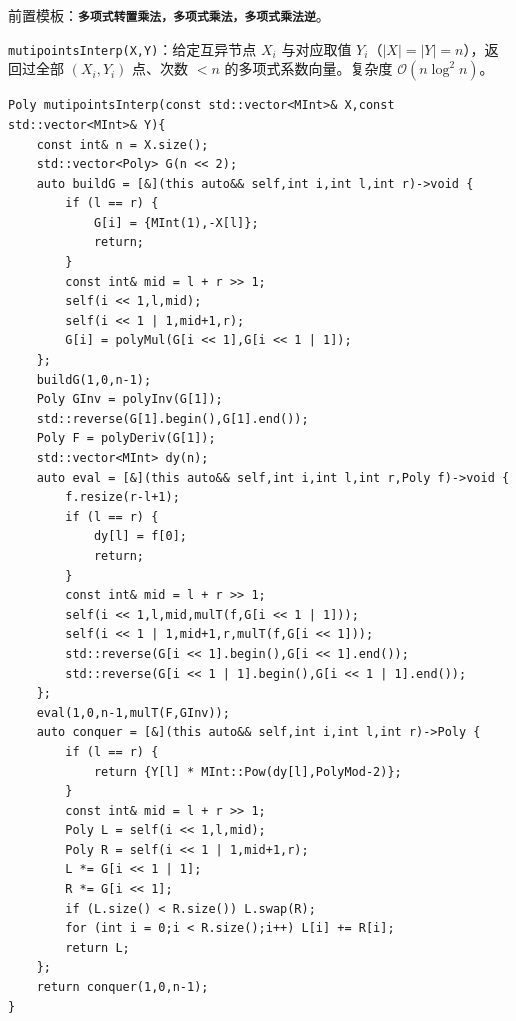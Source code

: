 前置模板：\textbf{\texttt{多项式转置乘法，多项式乘法，多项式乘法逆}}。

\texttt{mutipointsInterp(X,Y)}：给定互异节点 $X_i$ 与对应取值 $Y_i$（$|X|=|Y|=n$），返回过全部 $(X_i,Y_i)$ 点、次数 $<n$ 的多项式系数向量。复杂度 $\mathcal{O}(n\log^2 n)$。

\begin{lstlisting}
Poly mutipointsInterp(const std::vector<MInt>& X,const std::vector<MInt>& Y){
    const int& n = X.size();
    std::vector<Poly> G(n << 2);
    auto buildG = [&](this auto&& self,int i,int l,int r)->void {
        if (l == r) {
            G[i] = {MInt(1),-X[l]};
            return;
        }
        const int& mid = l + r >> 1;
        self(i << 1,l,mid);
        self(i << 1 | 1,mid+1,r);
        G[i] = polyMul(G[i << 1],G[i << 1 | 1]);
    };
    buildG(1,0,n-1);
    Poly GInv = polyInv(G[1]);
    std::reverse(G[1].begin(),G[1].end());
    Poly F = polyDeriv(G[1]);
    std::vector<MInt> dy(n);
    auto eval = [&](this auto&& self,int i,int l,int r,Poly f)->void {
        f.resize(r-l+1);
        if (l == r) {
            dy[l] = f[0];
            return;
        }
        const int& mid = l + r >> 1;
        self(i << 1,l,mid,mulT(f,G[i << 1 | 1]));
        self(i << 1 | 1,mid+1,r,mulT(f,G[i << 1]));
        std::reverse(G[i << 1].begin(),G[i << 1].end());
        std::reverse(G[i << 1 | 1].begin(),G[i << 1 | 1].end());
    };
    eval(1,0,n-1,mulT(F,GInv));
    auto conquer = [&](this auto&& self,int i,int l,int r)->Poly {
        if (l == r) {
            return {Y[l] * MInt::Pow(dy[l],PolyMod-2)};
        }
        const int& mid = l + r >> 1;
        Poly L = self(i << 1,l,mid);
        Poly R = self(i << 1 | 1,mid+1,r);
        L *= G[i << 1 | 1];
        R *= G[i << 1];
        if (L.size() < R.size()) L.swap(R);
        for (int i = 0;i < R.size();i++) L[i] += R[i];
        return L;
    };
    return conquer(1,0,n-1);
}
\end{lstlisting}